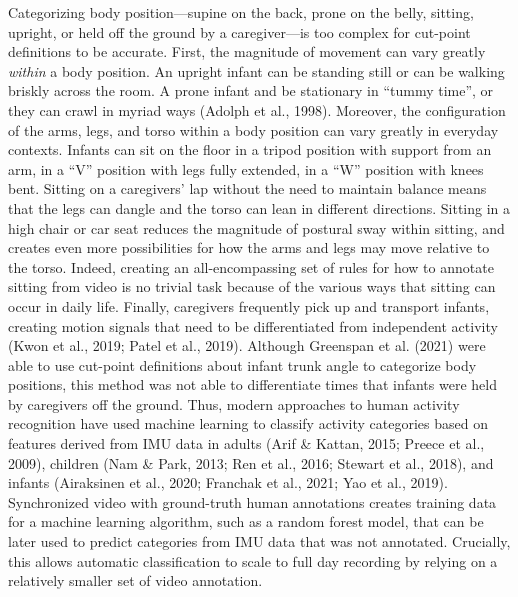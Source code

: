\documentclass[
  man]{apa6}
\begin{document}
Categorizing body position---supine on the back, prone on the belly, sitting, upright, or held off the ground by a caregiver---is too complex for cut-point definitions to be accurate. First, the magnitude of movement can vary greatly \emph{within} a body position. An upright infant can be standing still or can be walking briskly across the room. A prone infant and be stationary in ``tummy time'', or they can crawl in myriad ways (Adolph et al., 1998). Moreover, the configuration of the arms, legs, and torso within a body position can vary greatly in everyday contexts. Infants can sit on the floor in a tripod position with support from an arm, in a ``V'' position with legs fully extended, in a ``W'' position with knees bent. Sitting on a caregivers' lap without the need to maintain balance means that the legs can dangle and the torso can lean in different directions. Sitting in a high chair or car seat reduces the magnitude of postural sway within sitting, and creates even more possibilities for how the arms and legs may move relative to the torso. Indeed, creating an all-encompassing set of rules for how to annotate sitting from video is no trivial task because of the various ways that sitting can occur in daily life. Finally, caregivers frequently pick up and transport infants, creating motion signals that need to be differentiated from independent activity (Kwon et al., 2019; Patel et al., 2019). Although Greenspan et al. (2021) were able to use cut-point definitions about infant trunk angle to categorize body positions, this method was not able to differentiate times that infants were held by caregivers off the ground. Thus, modern approaches to human activity recognition have used machine learning to classify activity categories based on features derived from IMU data in adults (Arif \& Kattan, 2015; Preece et al., 2009), children (Nam \& Park, 2013; Ren et al., 2016; Stewart et al., 2018), and infants (Airaksinen et al., 2020; Franchak et al., 2021; Yao et al., 2019). Synchronized video with ground-truth human annotations creates training data for a machine learning algorithm, such as a random forest model, that can be later used to predict categories from IMU data that was not annotated. Crucially, this allows automatic classification to scale to full day recording by relying on a relatively smaller set of video annotation.
\end{document}
